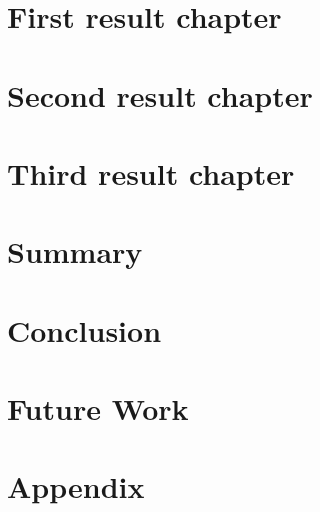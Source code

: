\myclearpage{}
\chapter{First result chapter}
\label{chap:reschap1}
 

\myclearpage{}
\chapter{Second result chapter}
\label{chap:reschap2}
 

\myclearpage{}
\chapter{Third result chapter}
\label{chap:reschap3}
 

\newpage\myclearpage{}
\chapter{Summary}
\label{chap:summary}


\newpage\myclearpage{}
\chapter{Conclusion}
\label{chap:conclusion}


\newpage\myclearpage{}
\chapter{Future Work}
\label{chap:future_work}


\myclearpage


\myclearpage{}
\appendix
\chapter{Appendix}


%
%

